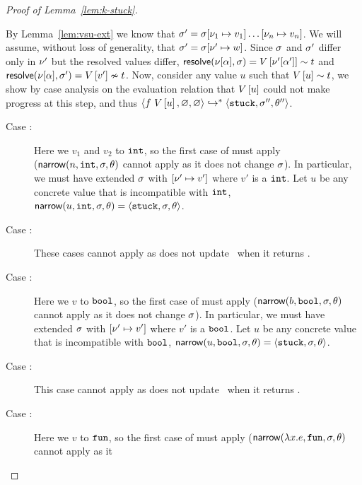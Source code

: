 \begin{proof}[Proof of Lemma~\ref{lem:k-stuck}]
\begin{description}
    By Lemma~\ref{lem:vsu-ext} we know that
    $\sigma' = \sigma[\nu_1 \mapsto v_1] \ldots [\nu_n \mapsto v_n]$.
    We will assume, without loss of generality, that
    $\sigma' = \sigma[\nu' \mapsto w]$.
    Since $\sigma$ and $\sigma'$ differ only in $\nu'$ but the resolved
    values differ,
    $\mathsf{resolve}(\nu[\alpha], \sigma) = V\left[\nu'[\alpha']\right] \sim t$
    and
    $\mathsf{resolve}(\nu[\alpha], \sigma') = V\left[v'\right] \nsim t$.
    Now, consider any value $u$ such that $V\left[u\right] \sim t$,
    we show by case analysis on the evaluation relation that
    $V\left[u\right]$ could not make progress at this step, and thus
    $\langle f\ V\left[u\right], \varnothing, \varnothing \rangle \hookrightarrow^{*} \langle \mathtt{stuck}, \sigma'', \theta'' \rangle{}$.
    \begin{description}
    \item[Case \replusgood:]
      Here we \forcesym $v_1$ and $v_2$ to $\mathtt{int}$, so the first case of
      \forcesym must apply\\ ($\mathsf{narrow}(n, \mathtt{int}, \sigma, \theta)$ cannot apply
      as it does not change $\sigma$).
      In particular, we must have extended $\sigma$ with
      $[\nu' \mapsto v']$ where $v'$ is a $\mathtt{int}$.
      Let $u$ be any concrete value that is incompatible with $\mathtt{int}$,
      $\mathsf{narrow}(u, \mathtt{int}, \sigma, \theta) = \langle \mathtt{stuck}, \sigma, \theta \rangle$.
    \item[Case :]
      These cases cannot apply as \forcesym does not update \vsu\ when
      it returns \stuck.
    \item[Case :]
      Here we \forcesym $v$ to $\mathtt{bool}$, so the first case of \forcesym
      must apply ($\mathsf{narrow}(b, \mathtt{bool}, \sigma, \theta)$ cannot apply as it
      does not change $\sigma$).
      In particular, we must have extended $\sigma$ with
      $[\nu' \mapsto v']$ where $v'$ is a $\mathtt{bool}$.
      Let $u$ be any concrete value that is incompatible with $\mathtt{bool}$,
      $\mathsf{narrow}(u, \mathtt{bool}, \sigma, \theta) = \langle \mathtt{stuck}, \sigma, \theta \rangle$.
    \item[Case \reifbad:]
      This case cannot apply as \forcesym does not update \vsu\ when
      it returns \stuck.
    \item[Case \reappgood:]
      Here we \forcesym $v$ to $\mathtt{fun}$, so the first case of \forcesym
      must apply ($\mathsf{narrow}(\lambda x. e, \mathtt{fun}, \sigma, \theta)$ cannot apply as it

\end{description}
\end{description}
\end{proof}
